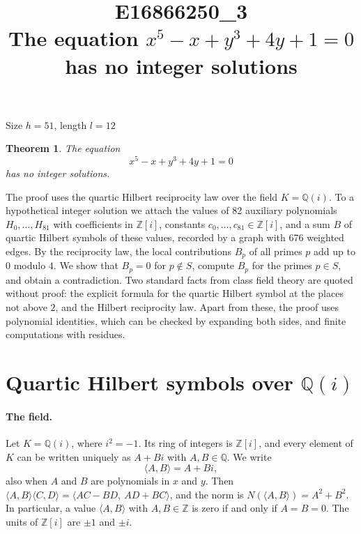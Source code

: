 \documentclass[11pt]{article}
\title{\textbf{E16866250\_3}\\[4pt] {\Large The equation $x^{5}-x+y^{3}+4y+1=0$ has no integer solutions}}
\author{}
\date{}
\newtheorem{theorem}{Theorem}
\newcommand{\Z}{\mathbb{Z}}
\newcommand{\Q}{\mathbb{Q}}
\begin{document}
\maketitle
\vspace{-8ex}
\begin{center}
Size $h=51$, length $l=12$
\end{center}

\begin{theorem}\label{thm:main}
The equation
\begin{equation}\label{eq:main}
x^{5}-x+y^{3}+4y+1=0
\end{equation}
has no integer solutions.
\end{theorem}

The proof uses the quartic Hilbert reciprocity law over the field $K=\Q(i)$. To a hypothetical integer solution we attach the values of 82 auxiliary polynomials $H_0,\dots,H_{81}$ with coefficients in $\Z[i]$, constants $c_0,\dots,c_{81}\in\Z[i]$, and a sum $B$ of quartic Hilbert symbols of these values, recorded by a graph with 676 weighted edges. By the reciprocity law, the local contributions $B_p$ of all primes $p$ add up to $0$ modulo $4$. We show that $B_p=0$ for $p\notin S$, compute $B_p$ for the primes $p\in S$, and obtain a contradiction. Two standard facts from class field theory are quoted without proof: the explicit formula for the quartic Hilbert symbol at the places not above $2$, and the Hilbert reciprocity law. Apart from these, the proof uses polynomial identities, which can be checked by expanding both sides, and finite computations with residues.


\section{\texorpdfstring{Quartic Hilbert symbols over $\Q(i)$}{Quartic Hilbert symbols over Q(i)}}\label{sec:symbols}

\paragraph{The field.} Let $K=\Q(i)$, where $i^2=-1$. Its ring of integers is $\Z[i]$, and every element of $K$ can be written uniquely as $A+Bi$ with $A,B\in\Q$. We write
\[
\langle A,B\rangle=A+Bi,
\]
also when $A$ and $B$ are polynomials in $x$ and $y$. Then $\langle A,B\rangle\langle C,D\rangle=\langle AC-BD,\ AD+BC\rangle$, and the norm is $N(\langle A,B\rangle)=A^2+B^2$. In particular, a value $\langle A,B\rangle$ with $A,B\in\Z$ is zero if and only if $A=B=0$. The units of $\Z[i]$ are $\pm1$ and $\pm i$.
\end{document}
